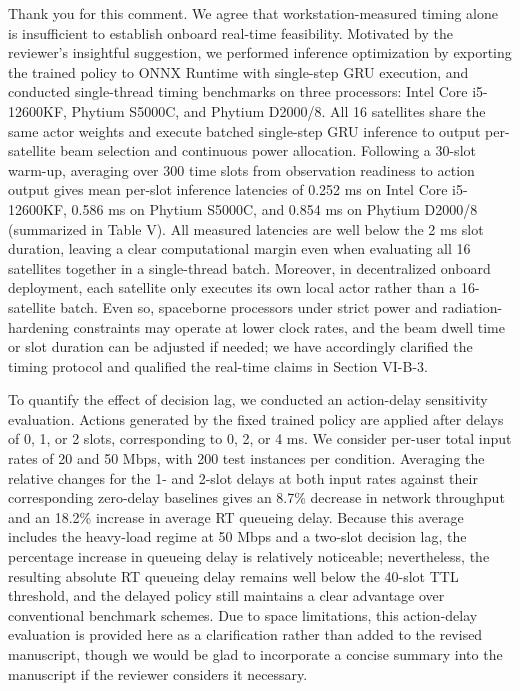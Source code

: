 \documentclass[11pt,a4paper]{article}
\newcommand{\qrev}[1]{{\color{qinrev}#1}}
\begin{document}
Thank you for this comment. We agree that workstation-measured timing alone is insufficient to establish onboard real-time feasibility. Motivated by the reviewer's insightful suggestion, we performed inference optimization by exporting the trained policy to ONNX Runtime with single-step GRU execution, and conducted \qrev{single-thread} timing benchmarks \qrev{on three processors: Intel Core i5-12600KF, Phytium S5000C, and Phytium D2000/8}. All 16 satellites share the same actor weights and execute batched single-step GRU inference to output per-satellite beam selection and continuous power allocation. Following a 30-slot warm-up, averaging over 300 time slots from observation readiness to action output gives mean per-slot inference \qrev{latencies of 0.252 ms on Intel Core i5-12600KF, 0.586 ms on Phytium S5000C, and 0.854 ms on Phytium D2000/8 (summarized in Table V). All measured latencies are} well below the 2 ms slot duration, leaving a clear computational margin even when evaluating all 16 satellites together in a single-thread batch. Moreover, in decentralized onboard deployment, each satellite only executes its own local actor rather than a 16-satellite batch. Even so, spaceborne processors under strict power and radiation-hardening constraints may operate at lower clock rates, and the beam dwell time or slot duration can be adjusted if needed; we have accordingly clarified the timing protocol and qualified the real-time claims in \qrev{Section VI-B-3}.
\par

To quantify the effect of decision lag, \qrev{we conducted an action-delay sensitivity evaluation}. Actions generated by the fixed trained policy are applied after delays of 0, 1, or 2 slots, corresponding to 0, 2, or 4 ms. We consider per-user total input rates of 20 and 50 Mbps, with 200 test instances per condition. Averaging the relative changes for the 1- and 2-slot delays at both input rates against their corresponding zero-delay baselines gives an 8.7\% decrease in network throughput and an 18.2\% increase in average RT queueing delay. Because this average includes the heavy-load regime at 50 Mbps and a two-slot decision lag, the percentage increase in queueing delay is relatively noticeable; nevertheless, the resulting absolute RT queueing delay remains well below the 40-slot TTL threshold, and the delayed policy still maintains a clear advantage over conventional benchmark schemes. \qrev{Due to space limitations, this action-delay evaluation is provided here as a clarification rather than added to the revised manuscript, though we would be glad to incorporate a concise summary into the manuscript if the reviewer considers it necessary.}
\par
\end{document}
